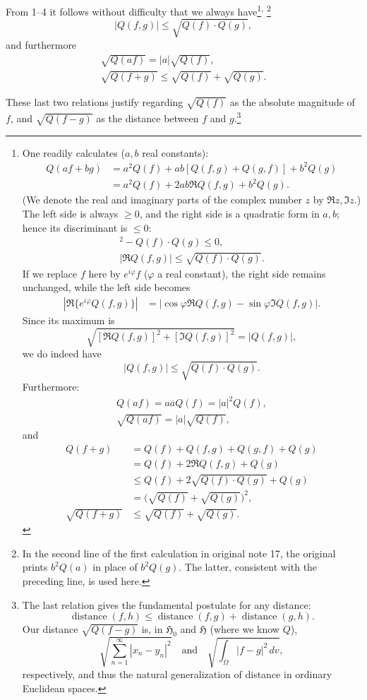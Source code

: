 \documentclass[fontsize=13pt,paper=b5,twoside,bookmarkpackage=false]{scrartcl}
\newcounter{translatornote}
\newcommand{\tnote}[1]{%
  \begingroup\stepcounter{translatornote}%
  \renewcommand{\thefootnote}{T\arabic{translatornote}}%
  \footnote[0]{#1}\endgroup}
\newcommand{\tnoteafter}[1]{\textsuperscript{,}\tnote{#1}}
\begin{document}
From 1--4 it follows without difficulty that we always have\footnote[17]{\label{fn:17}One readily calculates ($a,b$ real constants):
\begin{align*}
Q(af+bg)&=a^2Q(f)+ab[Q(f,g)+Q(g,f)]+b^2Q(g)\\
&=a^2Q(f)+2ab\Re Q(f,g)+b^2Q(g).
\end{align*}
(We denote the real and imaginary parts of the complex number $z$ by $\Re z,\Im z$.) The left side is always $\ge0$, and the right side is a quadratic form in $a,b$; hence its discriminant is $\le0$:
\begin{gather*}
[\Re Q(f,g)]^2-Q(f)\cdot Q(g)\le0,\\
|\Re Q(f,g)|\le\sqrt{Q(f)\cdot Q(g)}.
\end{gather*}
If we replace $f$ here by $e^{i\varphi}f$ ($\varphi$ a real constant), the right side remains unchanged, while the left side becomes
\begin{align*}
\left|\Re\{e^{i\varphi}Q(f,g)\}\right|
&=\left|\cos\varphi\Re Q(f,g)-\sin\varphi\Im Q(f,g)\right|.
\end{align*}
Since its maximum is
\[
\sqrt{[\Re Q(f,g)]^2+[\Im Q(f,g)]^2}=|Q(f,g)|,
\]
we do indeed have
\[
|Q(f,g)|\le\sqrt{Q(f)\cdot Q(g)}.
\]
Furthermore:
\begin{gather*}
Q(af)=a\overline{a}Q(f)=|a|^2Q(f),\\
\sqrt{Q(af)}=|a|\sqrt{Q(f)},
\end{gather*}
and
\begin{align*}
Q(f+g)&=Q(f)+Q(f,g)+Q(g,f)+Q(g)\\
&=Q(f)+2\Re Q(f,g)+Q(g)\\
&\le Q(f)+2\sqrt{Q(f)\cdot Q(g)}+Q(g)\\
&=\bigl(\sqrt{Q(f)}+\sqrt{Q(g)}\bigr)^2,\\
\sqrt{Q(f+g)}&\le\sqrt{Q(f)}+\sqrt{Q(g)}.
\end{align*}
}\tnoteafter{In the second line of the first calculation in original note 17, the original prints $b^2Q(a)$ in place of $b^2Q(g)$. The latter, consistent with the preceding line, is used here.}
\[
|Q(f,g)|\le\sqrt{Q(f)\cdot Q(g)},
\]
and furthermore
\begin{gather*}
\sqrt{Q(af)}=|a|\sqrt{Q(f)},\\
\sqrt{Q(f+g)}\le\sqrt{Q(f)}+\sqrt{Q(g)}.
\end{gather*}


These last two relations justify regarding $\sqrt{Q(f)}$ as the absolute magnitude of $f$, and $\sqrt{Q(f-g)}$ as the distance between $f$ and $g$.\footnote[18]{\label{fn:18}The last relation gives the fundamental postulate for any distance:
\[
\operatorname{distance}(f,h)\le\operatorname{distance}(f,g)+\operatorname{distance}(g,h).
\]
Our distance $\sqrt{Q(f-g)}$ is, in $\mathfrak{H}_0$ and $\mathfrak{H}$ (where we know $Q$),
\[
\sqrt{\sum_{n=1}^{\infty}|x_n-y_n|^2}
\quad\text{and}\quad
\sqrt{\int_\Omega|f-g|^2\,dv},
\]
respectively, and thus the natural generalization of distance in ordinary Euclidean spaces.
}
\end{document}
